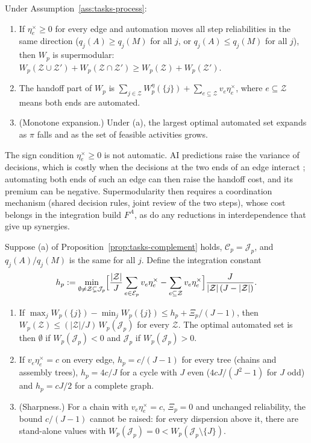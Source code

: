 \begin{proposition}[Complementarity]\label{prop:tasks-complement}
Under Assumption~\ref{ass:tasks-process}:
\begin{enumerate}
\item[(a)] If $\eta^\times_e\ge 0$ for every edge and automation moves all step reliabilities in the same direction ($q_j(A)\ge q_j(M)$ for all $j$, or $q_j(A)\le q_j(M)$ for all $j$), then $W_p$ is supermodular: $W_p(\mathcal Z\cup\mathcal Z')+W_p(\mathcal Z\cap\mathcal Z')\ge W_p(\mathcal Z)+W_p(\mathcal Z')$.
\item[(b)] The handoff part of $W_p$ is $\sum_{j\in\mathcal Z}W^\eta_p(\{j\})+\sum_{e\subseteq\mathcal Z}v_e\eta^\times_e$, where $e\subseteq\mathcal Z$ means both ends are automated.
\item[(c)] (Monotone expansion.) Under (a), the largest optimal automated set expands as $\pi$ falls and as the set of feasible activities grows.
\end{enumerate}
\end{proposition}

\noindent The sign condition $\eta^\times_e\ge 0$ is not automatic. AI predictions raise the variance of decisions, which is costly when the decisions at the two ends of an edge interact \citep{agrawal2024artificial}; automating both ends of such an edge can then raise the handoff cost, and its premium can be negative. Supermodularity then requires a coordination mechanism (shared decision rules, joint review of the two steps), whose cost belongs in the integration build $F^A$, as do any reductions in interdependence that give up synergies.

\begin{proposition}\label{prop:tasks-aon}
Suppose (a) of Proposition~\ref{prop:tasks-complement} holds, $\mathcal C_p=\mathcal J_p$, and $q_j(A)/q_j(M)$ is the same for all $j$. Define the integration constant
\begin{equation}\label{eq:tasks-h}
h_p:=\min_{\emptyset\ne\mathcal Z\subsetneq\mathcal J_p}\Bigl[\frac{|\mathcal Z|}{J}\sum_{e\in\mathcal E_p}v_e\eta^\times_e-\sum_{e\subseteq\mathcal Z}v_e\eta^\times_e\Bigr]\frac{J}{|\mathcal Z|\,(J-|\mathcal Z|)}.
\end{equation}
\begin{enumerate}
\item[(a)] If $\max_jW_p(\{j\})-\min_jW_p(\{j\})\le h_p+\Xi_p/(J-1)$, then $W_p(\mathcal Z)\le(|\mathcal Z|/J)\,W_p(\mathcal J_p)$ for every $\mathcal Z$. The optimal automated set is then $\emptyset$ if $W_p(\mathcal J_p)<0$ and $\mathcal J_p$ if $W_p(\mathcal J_p)>0$.
\item[(b)] If $v_e\eta^\times_e=c$ on every edge, $h_p=c/(J-1)$ for every tree (chains and assembly trees), $h_p=4c/J$ for a cycle with $J$ even ($4cJ/(J^2-1)$ for $J$ odd) and $h_p=cJ/2$ for a complete graph.
\item[(c)] (Sharpness.) For a chain with $v_e\eta^\times_e=c$, $\Xi_p=0$ and unchanged reliability, the bound $c/(J-1)$ cannot be raised: for every dispersion above it, there are stand-alone values with $W_p(\mathcal J_p)=0<W_p(\mathcal J_p\setminus\{J\})$.
\end{enumerate}
\end{proposition}

